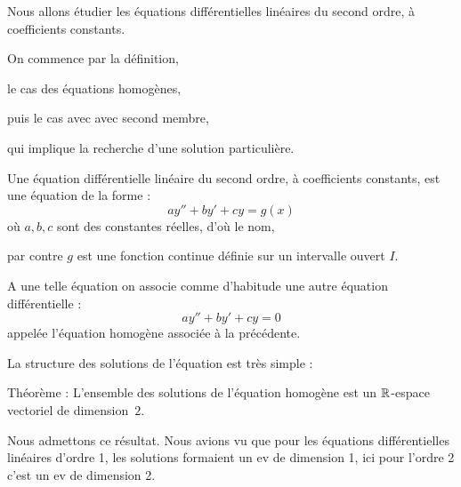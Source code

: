 







\debuttexte


\diapo

Nous allons étudier les équations différentielles linéaires 
du second ordre, à coefficients constants.

\change

\change
On commence par la définition,

\change
le cas des équations homogènes,

\change
puis le cas avec avec second membre,

\change
qui implique la recherche d'une solution particulière.


\diapo



Une équation différentielle linéaire du second ordre, à
 coefficients constants, est une équation de la forme :
\begin{equation}
ay''+by'+cy=g(x) 
\label{eq:linscd}
\tag{$E$}
\end{equation}
où $a,b,c$ sont des constantes réelles, d'où le nom,

par contre $g$ est une fonction continue définie sur un intervalle ouvert $I$.

\change

A une telle équation on associe comme d'habitude 
une autre équation différentielle :
\begin{equation}
ay''+by'+cy=0 
\label{eq:linscdhom}
\tag{$E_0$}
\end{equation}
appelée l'équation homogène associée à la précédente.


\change

La structure des solutions de l'équation est très simple :

Théorème : 
L'ensemble des solutions de l'équation homogène est 
un $\mathbb{R}$-espace vectoriel de dimension~$2$.


Nous admettons ce résultat. Nous avions vu que pour les équations différentielles
linéaires d'ordre 1, les solutions formaient un ev de dimension 1, ici
pour l'ordre 2 c'est un ev de dimension 2. 

\diapo

